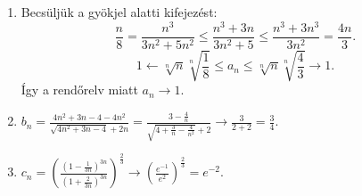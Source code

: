 \documentclass[11pt]{scrartcl}
\begin{document}
\begin{enumerate}
	\item Becsüljük a gyökjel alatti kifejezést:
	      \[
		      \frac{n}{8}
		      = \frac{n^3}{3n^2 + 5n^2}
		      \le \frac{n^3 + 3n}{3n^2 + 5}
		      \le \frac{n^3 + 3n^3}{3n^2}
		      = \frac{4n}{3}.
	      \]
	      \[
		      1 \leftarrow \sqrt[n]{n} \sqrt[n]{\frac{1}{8}}
		      \le a_n
		      \le \sqrt[n]{n} \sqrt[n]{\frac{4}{3}} \to 1.
	      \]
	      Így a rendőrelv miatt $a_n \to 1$.

	\item \(\displaystyle
	      b_n
	      =
	      \frac{4n^2 + 3n - 4 - 4n^2}{\sqrt{4n^2 + 3n - 4} + 2n}
	      =
	      \frac{3 - \frac{4}{n}}{\sqrt{4 + \frac{3}{n} - \frac{4}{n^2}} + 2}
	      \to
	      \frac{3}{2 + 2}
	      =
	      \frac{3}{4}.
	      \)

	\item \(\displaystyle
	      c_n
	      =
	      \left(
	      \frac{\left(1 - \frac{1}{3n}\right)^{3n}}{\left(1 + \frac{2}{3n}\right)^{3n}}
	      \right)^{\frac{2}{3}}
	      \to
	      \left( \frac{e^{-1}}{e^2} \right)^{\frac{2}{3}}
	      =
	      e^{-2}.
	      \)
\end{enumerate}
\end{document}
